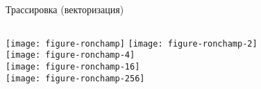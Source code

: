 
\begin{frame}{Трассировка (векторизация)}
\begin{columns}
\texttt{[image: figure-ronchamp]}
\texttt{[image: figure-ronchamp-2]}\\[1ex]
\texttt{[image: figure-ronchamp-4]}\\[1ex]
\texttt{[image: figure-ronchamp-16]}\\[1ex]
\texttt{[image: figure-ronchamp-256]}
\end{columns}
\end{frame}
